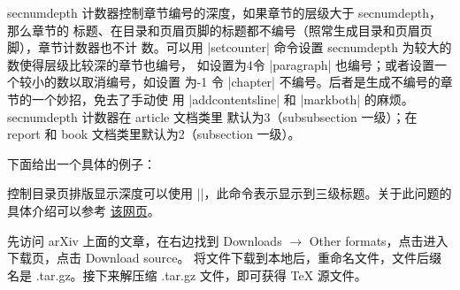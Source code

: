 secnumdepth 计数器控制章节编号的深度，如果章节的层级大于 secnumdepth，那么章节的
标题、在目录和页眉页脚的标题都不编号（照常生成目录和页眉页脚），章节计数器也不计
数。可以用 |setcounter| 命令设置 secnumdepth 为较大的数使得层级比较深的章节也编号，
如设置为4令 |paragraph| 也编号；或者设置一个较小的数以取消编号，如设置
为-1 令 |chapter| 不编号。后者是生成不编号的章节的一个妙招，免去了手动使
用 |addcontentsline| 和 |markboth| 的麻烦。secnumdepth 计数器在 article 文档类里
默认为3（subsubsection 一级）；在 report 和 book 文档类里默认为2（subsection 一级）。

下面给出一个具体的例子：


控制目录页排版显示深度可以使用 |\setcounter{tocdepth}{2}|，此命令表示显示到三级标题。关于此问题的具体介绍可以参考
\href{https://blog.csdn.net/RobertChenGuangzhi/article/details/50480856}{该网页}。


先访问 arXiv 上面的文章，在右边找到 Downloads $\rightarrow$ Other formats，点击进入下载页，点击 Download source。
将文件下载到本地后，重命名文件，文件后缀名是 .tar.gz。接下来解压缩 .tar.gz 文件，即可获得 \TeX{} 源文件。


